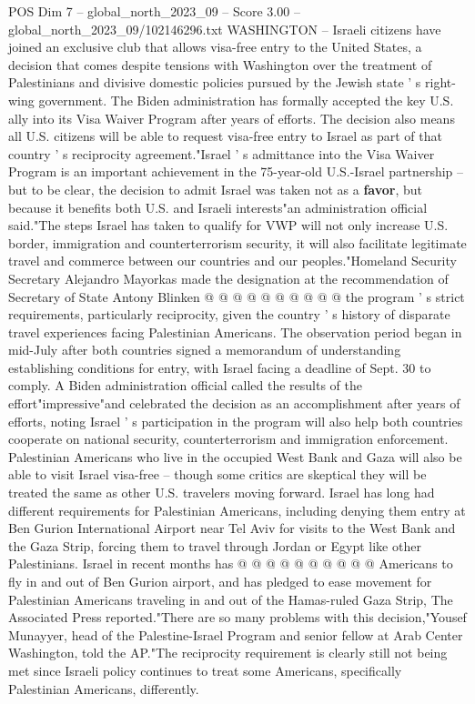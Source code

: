 \begin{textsample}{POS Dim 7 – global\_north\_2023\_09 – Score 3.00 – global\_north\_2023\_09/102146296.txt}  \label{ex:f7_pos_367}
WASHINGTON -- Israeli citizens have joined an exclusive club that allows visa-free entry to the United States, a decision that comes despite tensions with Washington over the treatment of Palestinians and divisive domestic policies pursued by the Jewish state ' s right-wing government.
The Biden administration has formally accepted the key U.S. ally into its Visa Waiver Program after years of efforts.
The decision also means all U.S. citizens will be able to request visa-free entry to Israel as part of that country ' s reciprocity agreement."Israel ' s admittance into the Visa Waiver Program is an important achievement in the 75-year-old U.S.-Israel partnership -- but to be clear, the decision to admit Israel was taken not as a \textbf{favor}, but because it benefits both U.S. and Israeli interests"an administration official said."The steps Israel has taken to qualify for VWP will not only increase U.S. border, immigration and counterterrorism security, it will also facilitate legitimate travel and commerce between our countries and our peoples."Homeland Security Secretary Alejandro Mayorkas made the designation at the recommendation of Secretary of State Antony Blinken @ @ @ @ @ @ @ @ @ @ the program ' s strict requirements, particularly reciprocity, given the country ' s history of disparate travel experiences facing Palestinian Americans.
The observation period began in mid-July after both countries signed a memorandum of understanding establishing conditions for entry, with Israel facing a deadline of Sept. 30 to comply.
A Biden administration official called the results of the effort"impressive"and celebrated the decision as an accomplishment after years of efforts, noting Israel ' s participation in the program will also help both countries cooperate on national security, counterterrorism and immigration enforcement.
Palestinian Americans who live in the occupied West Bank and Gaza will also be able to visit Israel visa-free -- though some critics are skeptical they will be treated the same as other U.S. travelers moving forward.
Israel has long had different requirements for Palestinian Americans, including denying them entry at Ben Gurion International Airport near Tel Aviv for visits to the West Bank and the Gaza Strip, forcing them to travel through Jordan or Egypt like other Palestinians.
Israel in recent months has @ @ @ @ @ @ @ @ @ @ Americans to fly in and out of Ben Gurion airport, and has pledged to ease movement for Palestinian Americans traveling in and out of the Hamas-ruled Gaza Strip, The Associated Press reported."There are so many problems with this decision,"Yousef Munayyer, head of the Palestine-Israel Program and senior fellow at Arab Center Washington, told the AP."The reciprocity requirement is clearly still not being met since Israeli policy continues to treat some Americans, specifically Palestinian Americans, differently.

\end{textsample}
